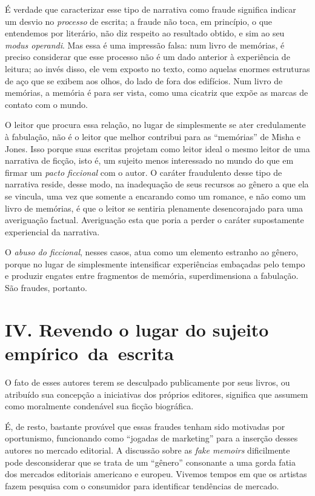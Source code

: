 É verdade que caracterizar esse tipo de narrativa como fraude significa
indicar um desvio no \emph{processo} de escrita; a fraude não toca, em
princípio, o que entendemos por literário, não diz respeito ao resultado
obtido, e sim ao seu \emph{modus operandi}. Mas essa é uma impressão
falsa: num livro de memórias, é preciso considerar que esse processo não
é um dado anterior à experiência de leitura; ao invés disso, ele vem
exposto no texto, como aquelas enormes estruturas de aço que se exibem
aos olhos, do lado de fora dos edifícios. Num livro de memórias, a
memória é para ser vista, como uma cicatriz que expõe as marcas de
contato com o mundo.

O leitor que procura essa relação, no lugar de simplesmente se ater
credulamente à fabulação, não é o leitor que melhor contribui para as
``memórias'' de Misha e Jones. Isso porque suas escritas projetam como
leitor ideal o mesmo leitor de uma narrativa de ficção, isto é, um
sujeito menos interessado no mundo do que em firmar um \emph{pacto
ficcional} com o autor. O caráter fraudulento desse tipo de narrativa
reside, desse modo, na inadequação de seus recursos ao gênero a que ela
se vincula, uma vez que somente a encarando como um romance, e não como
um livro de memórias, é que o leitor se sentiria plenamente
desencorajado para uma averiguação factual. Averiguação esta que poria a
perder o caráter supostamente experiencial da narrativa.

O \emph{abuso do ficcional}, nesses casos, atua como um elemento
estranho ao gênero, porque no lugar de simplesmente intensificar
experiências embaçadas pelo tempo e produzir engates entre fragmentos de
memória, superdimensiona a fabulação. São fraudes, portanto.

\section*{IV. Revendo o lugar do sujeito empírico~da~escrita}

O fato de esses autores terem se desculpado publicamente por seus
livros, ou atribuído sua concepção a iniciativas dos próprios editores,
significa que assumem como moralmente condenável sua ficção biográfica.

É, de resto, bastante provável que essas fraudes tenham sido motivadas
por oportunismo, funcionando como ``jogadas de marketing'' para a
inserção desses autores no mercado editorial. A discussão sobre as
\emph{fake memoirs} dificilmente pode desconsiderar que se trata de um
``gênero'' consonante a uma gorda fatia dos mercados editoriais
americano e europeu. Vivemos tempos em que os artistas fazem pesquisa
com o consumidor para identificar tendências de mercado.

